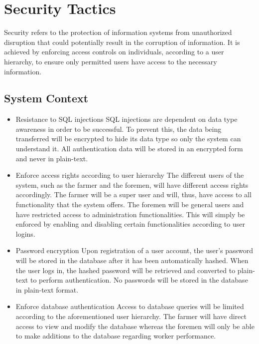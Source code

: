 \documentclass[11pt,fleqn]{book} %
\begin{document}
	\section{Security Tactics}
	Security refers to the protection of information systems from unauthorized disruption that could potentially result in the corruption of information. It is achieved by enforcing access controls on individuals, according to a user hierarchy, to ensure only permitted users have access to the necessary information.
	\subsection{System Context}
	\begin{itemize}
		\item Resistance to SQL injections\newline\newline
		SQL injections are dependent on data type awareness in order to be successful. To prevent this, the data being transferred will be encrypted to hide its data type so only the system can understand it. All authentication data will be stored in an encrypted form and never in plain-text.\newline
		
		\item Enforce access rights according to user hierarchy \newline\newline
		The different users of the system, such as the farmer and the foremen, will have different access rights accordingly. The farmer will be a super user and will, thus, have access to all functionality that the system offers. The foremen will be general users and have restricted access to administration functionalities. This will simply be enforced by enabling and disabling certain functionalities according to user logins.\newline
		
		\item Password encryption\newline\newline
		Upon registration of a user account, the user’s password will be stored in the database after it has been automatically hashed. When the user logs in, the hashed password will be retrieved and converted to plain-text to perform authentication. No passwords will be stored in the database in plain-text format.\newline
		
		\item Enforce database authentication\newline\newline
		Access to database queries will be limited according to the aforementioned user hierarchy. The farmer will have direct access to view and modify the database whereas the foremen will only be able to make additions to the database regarding worker performance.			
	\end{itemize}
\end{document}
